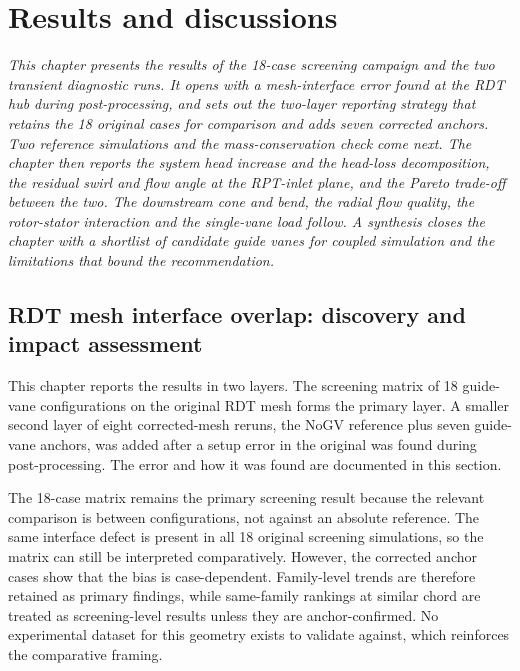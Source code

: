 \chapter{Results and discussions}
\label{chap:results_discussion}  

\begin{center} %
\singlespacing\parbox{12cm}{\textit{
This chapter presents the results of the 18-case screening campaign and the two transient diagnostic runs. It opens with a mesh-interface error found at the RDT hub during post-processing, and sets out the two-layer reporting strategy that retains the 18 original cases for comparison and adds seven corrected anchors. Two reference simulations and the mass-conservation check come next. The chapter then reports the system head increase and the head-loss decomposition, the residual swirl and flow angle at the RPT-inlet plane, and the Pareto trade-off between the two. The downstream cone and bend, the radial flow quality, the rotor-stator interaction and the single-vane load follow. A synthesis closes the chapter with a shortlist of candidate guide vanes for coupled simulation and the limitations that bound the recommendation.
}}
\end{center}

\section{RDT mesh interface overlap: discovery and impact assessment}
\label{sec:rdt-mesh-overlap}
This chapter reports the results in two layers. The screening matrix of 18 guide-vane configurations on the original RDT mesh forms the primary layer. A smaller second layer of eight corrected-mesh reruns, the NoGV reference plus seven guide-vane anchors, was added after a setup error in the original was found during post-processing. The error and how it was found are documented in this section.

The 18-case matrix remains the primary screening result because the relevant comparison is between configurations, not against an absolute reference. The same interface defect is present in all 18 original screening simulations, so the matrix can still be interpreted comparatively. However, the corrected anchor cases show that the bias is case-dependent. Family-level trends are therefore retained as primary findings, while same-family rankings at similar chord are treated as screening-level results unless they are anchor-confirmed. No experimental dataset for this geometry exists to validate against, which reinforces the comparative framing.


